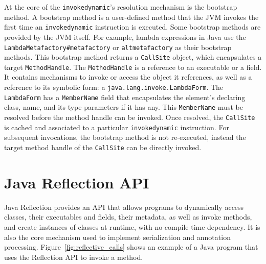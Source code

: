 At the core of the \verb|invokedynamic|'s resolution mechanism is the bootstrap method. A bootstrap method is a user-defined method that the JVM invokes the first time an \verb|invokedynamic| instruction is executed. Some bootstrap methods are provided by the JVM itself. For example, lambda expressions in Java use the \verb|LambdaMetafactory#metafactory| or \verb|altmetafactory| as their bootstrap methods.
This bootstrap method returns a \verb|CallSite| object, which encapsulates a target \verb|MethodHandle|. The \verb|MethodHandle| is a reference to an executable or a field. 
It contains mechanisms to invoke or access the object it references, as well as a reference to its symbolic form: a \verb|java.lang.invoke.LambdaForm|. The \verb|LambdaForm| has a \verb|MemberName| field that encapsulates the element's declaring class, name, and its type parameters if it has any. This \verb|MemberName| must be resolved before the method handle can be invoked. 
Once resolved, the \verb|CallSite| is cached and associated to a particular \verb|invokedynamic| instruction.
For subsequent invocations, the bootstrap method is not re-executed, instead the target method handle of the \verb|CallSite| can be directly invoked.
\section{Java Reflection API}
Java Reflection provides an API that allows programs to dynamically access classes, their executables and fields, their metadata, as well as invoke methods, and create instances of classes at runtime, with no compile-time dependency. It is also the core mechanism used to implement serialization and annotation processing. Figure~\ref{fig:reflective_calls} shows an example of a Java program that uses the Reflection API to invoke a method.

